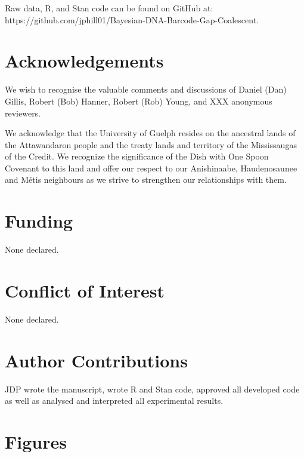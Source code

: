 \documentclass[12pt]{article}
\begin{document}
Raw data, R, and Stan code can be found on GitHub at: \\ https://github.com/jphill01/Bayesian-DNA-Barcode-Gap-Coalescent.

\section*{Acknowledgements}

We wish to recognise the valuable comments and discussions of Daniel (Dan) Gillis, Robert (Bob) Hanner, Robert (Rob) Young, and XXX anonymous reviewers.

We acknowledge that the University of Guelph resides on the ancestral lands of the Attawandaron people and the treaty lands and territory of the Mississaugas of the Credit. We recognize the significance of the Dish with One Spoon Covenant to this land and offer our respect to our Anishinaabe, Haudenosaunee and M{\'e}tis neighbours as we strive to strengthen our relationships with them.

\section*{Funding}

None declared.

\section*{Conflict of Interest}

None declared.

\section*{Author Contributions}

JDP wrote the manuscript, wrote R and Stan code, approved all developed code as well as analysed and interpreted all experimental results. 




\section*{Figures}
\end{document}
